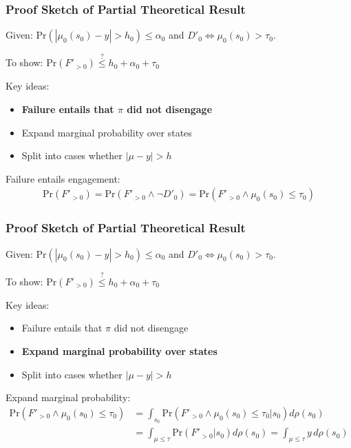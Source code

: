 \documentclass[handout]{beamer}
\begin{document}
\begin{frame}
    \frametitle{Proof Sketch of Partial Theoretical Result}

    Given: $\text{Pr}(|\mu_0(s_0) - y| > h_0) \leq \alpha_0$ and $D'_0 \Leftrightarrow \mu_0(s_0) > \tau_0$.

    To show: $\text{Pr}(F'_{>0}) \overset{?}{\leq} h_0 + \alpha_0 + \tau_0$

    \vspace{.5em}

    Key ideas:
    \begin{itemize}
    \item \textbf{Failure entails that $\pi$ did not disengage}
    \item Expand marginal probability over states
    \item Split into cases whether $|\mu - y|>h$
    \end{itemize}

    Failure entails engagement:
    \begin{align*}
    \text{Pr}(F'_{>0})  = \text{Pr}(F'_{>0} \wedge \neg D'_0) = \text{Pr}(F'_{>0} \wedge \mu_0(s_0) \leq \tau_0)
    \end{align*}

\end{frame}

\begin{frame}
    \frametitle{Proof Sketch of Partial Theoretical Result}

    Given: $\text{Pr}(|\mu_0(s_0) - y| > h_0) \leq \alpha_0$ and $D'_0 \Leftrightarrow \mu_0(s_0) > \tau_0$.

    To show: $\text{Pr}(F'_{>0}) \overset{?}{\leq} h_0 + \alpha_0 + \tau_0$

    \vspace{.5em}

    Key ideas:
    \begin{itemize}
    \item Failure entails that $\pi$ did not disengage
    \item \textbf{Expand marginal probability over states}
    \item Split into cases whether $|\mu - y|>h$
    \end{itemize}

    Expand marginal probability:
    \begin{align*}
    \text{Pr}(F'_{>0} \wedge \mu_0(s_0) \leq \tau_0)
         &= \int_{s_0}\text{Pr}(F'_{>0} \wedge \mu_0(s_0) \leq \tau_0|s_0)d\rho(s_0) \\
         &= \int_{\mu \leq \tau}\text{Pr}(F'_{>0}|s_0)d\rho(s_0) = \int_{\mu \leq \tau}y\, d\rho(s_0)
    \end{align*}

\end{frame}
\end{document}

